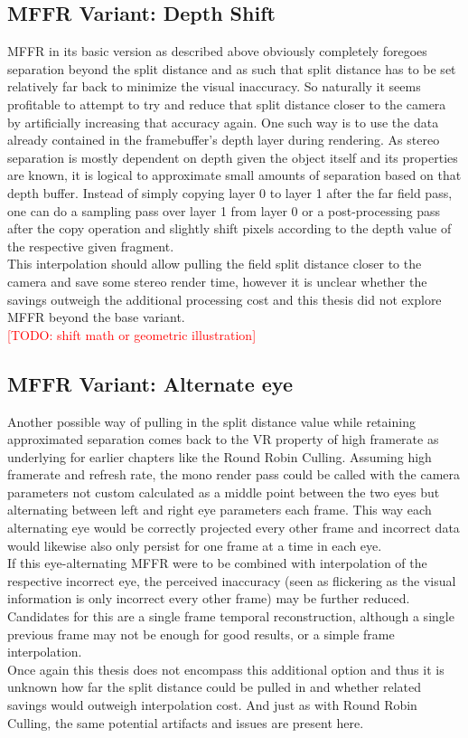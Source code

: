 \subsection{MFFR Variant: Depth Shift}  \label{mffr_depthshift}
MFFR in its basic version as described above obviously completely foregoes separation beyond the split distance and as such that split distance has to be set relatively far back to minimize the visual inaccuracy. So naturally it seems profitable to attempt to try and reduce that split distance closer to the camera by artificially increasing that accuracy again. One such way is to use the data already contained in the framebuffer's depth layer during rendering. 
As stereo separation is mostly dependent on depth given the object itself and its properties are known, it is logical to approximate small amounts of separation based on that depth buffer. 
Instead of simply copying layer 0 to layer 1 after the far field pass, one can do a sampling pass over layer 1 from layer 0 or a post-processing pass after the copy operation and slightly shift pixels according to the depth value of the respective given fragment. \\
This interpolation should allow pulling the field split distance closer to the camera and save some stereo render time, however it is unclear whether the savings outweigh the additional processing cost and this thesis did not explore MFFR beyond the base variant. \\

\textcolor{red}{[TODO: shift math or geometric illustration]}

\subsection{MFFR Variant: Alternate eye}
Another possible way of pulling in the split distance value while retaining approximated separation comes back to the VR property of high framerate as underlying for earlier chapters like the Round Robin Culling. 
Assuming high framerate and refresh rate, the mono render pass could be called with the camera parameters not custom calculated as a middle point between the two eyes but alternating between left and right eye parameters each frame. This way each alternating eye would be correctly projected every other frame and incorrect data would likewise also only persist for one frame at a time in each eye. \\
If this eye-alternating MFFR were to be combined with interpolation of the respective incorrect eye, the perceived inaccuracy (seen as flickering as the visual information is only incorrect every other frame) may be further reduced. Candidates for this are a single frame temporal reconstruction, although a single previous frame may not be enough for good results, or a simple frame interpolation. \\
Once again this thesis does not encompass this additional option and thus it is unknown how far the split distance could be pulled in and whether related savings would outweigh interpolation cost. And just as with Round Robin Culling, the same potential artifacts and issues are present here. 